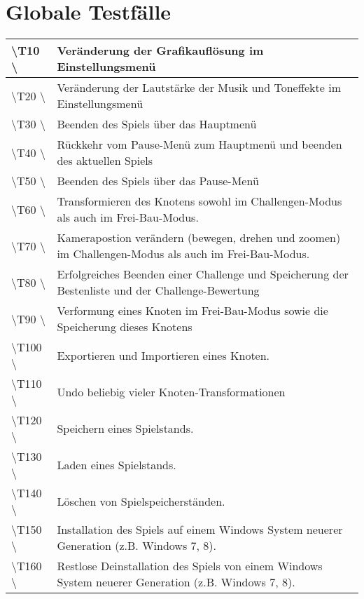 \chapter{Globale Testfälle}

\begin{tabular}{|p{}|p{}|}
\hline 
\textbackslash T10  \textbackslash & Veränderung der Grafikauflösung  im Einstellungsmenü \\ 
\hline 
\textbackslash T20  \textbackslash & Veränderung der Lautstärke der Musik und Toneffekte im Einstellungsmenü  \\ 
\hline 
\textbackslash T30  \textbackslash & Beenden des Spiels über das Hauptmenü\\ 
\hline
\textbackslash T40  \textbackslash & Rückkehr vom Pause-Menü zum Hauptmenü und beenden des aktuellen Spiels \\ 
\hline
\textbackslash T50  \textbackslash & Beenden des Spiels über das Pause-Menü\\ 
\hline
\textbackslash T60  \textbackslash & Transformieren des Knotens sowohl im Challengen-Modus als auch im Frei-Bau-Modus.\\ 
\hline
\textbackslash T70  \textbackslash & Kamerapostion verändern (bewegen, drehen und zoomen) im Challengen-Modus als auch im Frei-Bau-Modus.\\ 
\hline
\textbackslash T80  \textbackslash & Erfolgreiches Beenden einer Challenge und Speicherung der Bestenliste und der Challenge-Bewertung\\ 
\hline
\textbackslash T90  \textbackslash & Verformung eines Knoten im Frei-Bau-Modus sowie die Speicherung dieses Knotens\\ 
\hline
\textbackslash T100  \textbackslash & Exportieren und Importieren eines Knoten.\\ 
\hline
\textbackslash T110  \textbackslash & Undo beliebig vieler Knoten-Transformationen\\ 
\hline
\textbackslash T120 \textbackslash & Speichern eines Spielstands. \\
\hline
\textbackslash T130 \textbackslash & Laden eines Spielstands. \\
\hline
\textbackslash T140 \textbackslash & Löschen von Spielspeicherständen. \\
\hline
\textbackslash T150 \textbackslash & Installation des Spiels auf einem Windows System neuerer Generation (z.B. Windows 7, 8). \\
\hline
\textbackslash T160 \textbackslash & Restlose Deinstallation des Spiels von einem Windows System neuerer Generation (z.B. Windows 7, 8). \\
\hline
\end{tabular} 
